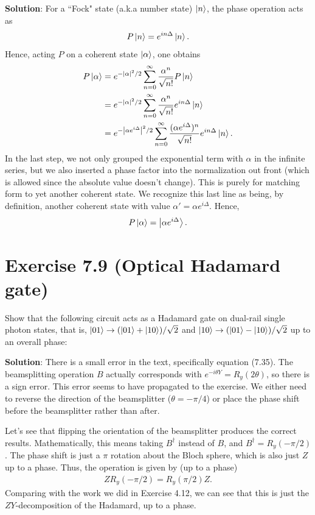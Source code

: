 \documentclass{book}
\begin{document}
    \textbf{Solution}: For a ``Fock" state (a.k.a number state) $\ket{n}$, the phase operation acts as 
    \begin{align}
        P\ket{n} = e^{i n \Delta} \ket{n}.
    \end{align}
    Hence, acting $P$ on a coherent state $\ket{\alpha}$, one obtains
    \begin{align}
    \begin{aligned}
        P \ket{\alpha} &= e^{-\abs{\alpha}^2/2} \sum_{n=0}^\infty \frac{\alpha^n}{\sqrt{n!}} P\ket{n} \\
        &= e^{-\abs{\alpha}^2/2} \sum_{n=0}^\infty \frac{\alpha^n}{\sqrt{n!}} e^{i n\Delta}\ket{n} \\
        &= e^{-\abs{\alpha e^{i\Delta}}^2/2} \sum_{n=0}^\infty \frac{(\alpha e^{i\Delta})^n}{\sqrt{n!}} e^{i n\Delta}\ket{n}.
    \end{aligned}
    \end{align}
    In the last step, we not only grouped the exponential term with $\alpha$ in the infinite series, but we also inserted a phase factor into the normalization out front (which is allowed since the absolute value doesn't change). This is purely for matching form to yet another coherent state. We recognize this last line as being, by definition, another coherent state with value $\alpha' = \alpha e^{i\Delta}$. Hence,
    \begin{align}
        P\ket{\alpha} = \ket{\alpha e^{i\Delta}}.
    \end{align}

\section*{Exercise 7.9 (Optical Hadamard gate)}
    Show that the following circuit acts as a Hadamard gate on  dual-rail single photon states, that is, $\ket{01} \to (\ket{01} + \ket{10})/\sqrt{2}$ and $\ket{10}\to (\ket{01} - \ket{10})/\sqrt{2}$ up to an overall phase:

    \textbf{Solution}: There is a small error in the text, specifically equation (7.35). The beamsplitting operation $B$ actually corresponds with $e^{-i\theta Y} = R_y (2\theta)$, so there is a sign error. This error seems to have propagated to the exercise. We either need to reverse the direction of the beamsplitter ($\theta = -\pi/4$) or place the phase shift before the beamsplitter rather than after.
    
    Let's see that flipping the orientation of the beamsplitter produces the correct results. Mathematically, this means taking $B^\dagger$ instead of $B$, and $B^\dagger = R_y(-\pi/2)$. The phase shift is just a $\pi$ rotation about the Bloch sphere, which is also just $Z$ up to a phase. Thus, the operation is given by (up to a phase)
    \begin{align}
        Z R_y(-\pi/2) = R_y(\pi/2) Z.
    \end{align}
    Comparing with the work we did in Exercise 4.12, we can see that this is just the $ZY$-decomposition of the Hadamard, up to a phase. 
    
\end{document}
